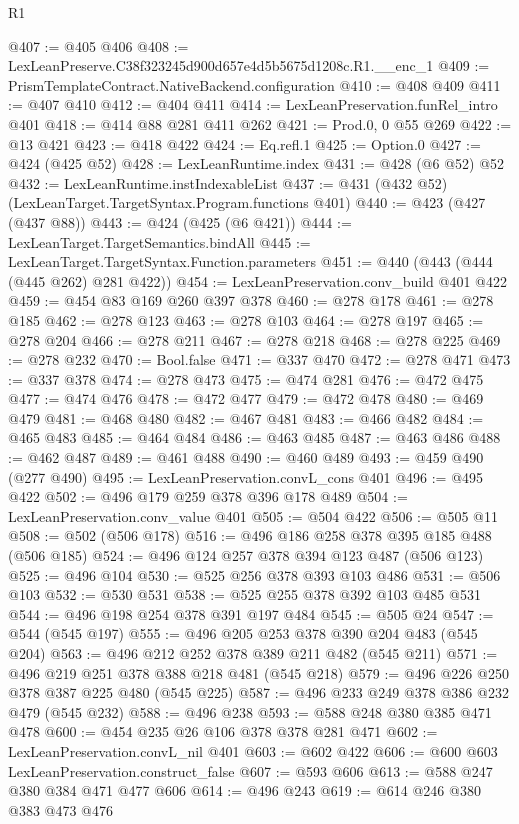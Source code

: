 \begin{lexlean}{R1}
\begin{coremodule}
@407 := @405 @406
@408 := LexLeanPreserve.C38f323245d900d657e4d5b5675d1208c.R1.__enc_1
@409 := PrismTemplateContract.NativeBackend.configuration
@410 := @408 @409
@411 := @407 @410
@412 := @404 @411
@414 := LexLeanPreservation.funRel_intro @401
@418 := @414 @88 @281 @411 @262
@421 := Prod.{0, 0} @55 @269
@422 := @13 @421
@423 := @418 @422
@424 := Eq.refl.{1}
@425 := Option.{0}
@427 := @424 (@425 @52)
@428 := LexLeanRuntime.index
@431 := @428 (@6 @52) @52
@432 := LexLeanRuntime.instIndexableList
@437 := @431 (@432 @52) (LexLeanTarget.TargetSyntax.Program.functions @401)
@440 := @423 (@427 (@437 @88))
@443 := @424 (@425 (@6 @421))
@444 := LexLeanTarget.TargetSemantics.bindAll
@445 := LexLeanTarget.TargetSyntax.Function.parameters
@451 := @440 (@443 (@444 (@445 @262) @281 @422))
@454 := LexLeanPreservation.conv_build @401 @422
@459 := @454 @83 @169 @260 @397 @378
@460 := @278 @178
@461 := @278 @185
@462 := @278 @123
@463 := @278 @103
@464 := @278 @197
@465 := @278 @204
@466 := @278 @211
@467 := @278 @218
@468 := @278 @225
@469 := @278 @232
@470 := Bool.false
@471 := @337 @470
@472 := @278 @471
@473 := @337 @378
@474 := @278 @473
@475 := @474 @281
@476 := @472 @475
@477 := @474 @476
@478 := @472 @477
@479 := @472 @478
@480 := @469 @479
@481 := @468 @480
@482 := @467 @481
@483 := @466 @482
@484 := @465 @483
@485 := @464 @484
@486 := @463 @485
@487 := @463 @486
@488 := @462 @487
@489 := @461 @488
@490 := @460 @489
@493 := @459 @490 (@277 @490)
@495 := LexLeanPreservation.convL_cons @401
@496 := @495 @422
@502 := @496 @179 @259 @378 @396 @178 @489
@504 := LexLeanPreservation.conv_value @401
@505 := @504 @422
@506 := @505 @11
@508 := @502 (@506 @178)
@516 := @496 @186 @258 @378 @395 @185 @488 (@506 @185)
@524 := @496 @124 @257 @378 @394 @123 @487 (@506 @123)
@525 := @496 @104
@530 := @525 @256 @378 @393 @103 @486
@531 := @506 @103
@532 := @530 @531
@538 := @525 @255 @378 @392 @103 @485 @531
@544 := @496 @198 @254 @378 @391 @197 @484
@545 := @505 @24
@547 := @544 (@545 @197)
@555 := @496 @205 @253 @378 @390 @204 @483 (@545 @204)
@563 := @496 @212 @252 @378 @389 @211 @482 (@545 @211)
@571 := @496 @219 @251 @378 @388 @218 @481 (@545 @218)
@579 := @496 @226 @250 @378 @387 @225 @480 (@545 @225)
@587 := @496 @233 @249 @378 @386 @232 @479 (@545 @232)
@588 := @496 @238
@593 := @588 @248 @380 @385 @471 @478
@600 := @454 @235 @26 @106 @378 @378 @281 @471
@602 := LexLeanPreservation.convL_nil @401
@603 := @602 @422
@606 := @600 @603 LexLeanPreservation.construct_false
@607 := @593 @606
@613 := @588 @247 @380 @384 @471 @477 @606
@614 := @496 @243
@619 := @614 @246 @380 @383 @473 @476

\end{coremodule}
\end{lexlean}

